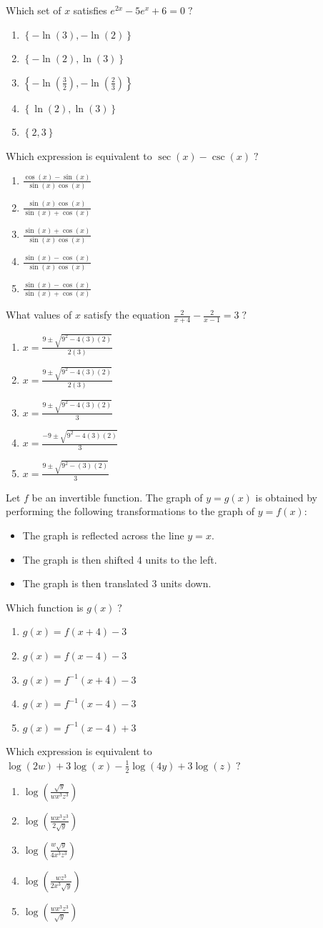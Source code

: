 \documentclass[letterstyle,12pt]{extarticle}
\newcounter{qcounter}
\newcommand{\choices}[5]{
\vspace{0.8em} 
\begin{enumerate}[label=(\Alph*)]
\setlength\itemsep{1em} 
\item
#1 
\item 
#2
\item
#3
\item
#4
\item
#5
\end{enumerate}
}
\newcommand{\ans}[1]{{\color{black} #1}}
\newenvironment{question}
    {\begin{minipage}{0.9 \textwidth}
        \item
    }
    { 
    \end{minipage} \vspace{4ex}
    }
\begin{document}
\begin{list}{\textbf{.}~}{}
\begin{question}
Which set of \(x\) satisfies \(e^{2x} - 5e^x + 6 = 0 \; ?\)
\choices
{\(\left\{-\ln(3), -\ln(2)\right\}\)}
{\(\left\{ -\ln(2), \ln(3)\right\}\)}
{\(\left\{-\ln \left(\frac{3}{2}\right), -\ln \left(\frac{2}{3}\right)\right\}\)}
{\ans{{\(\left\{ \ln(2), \ln(3)\right\}\)}}}
{\(\left\{2, 3\right\}\)}
\end{question}

\begin{question}
Which expression is equivalent to \(\sec(x) - \csc(x) \; ?\)
\choices
{\(\frac{\cos(x) - \sin(x)}{\sin(x) \cos(x)}\)}
{\(\frac{\sin(x) \cos(x)}{\sin(x) + \cos(x)}\)}
{\(\frac{\sin(x) + \cos(x)}{\sin(x) \cos(x)}\)}
{\ans{\(\frac{\sin(x) - \cos(x)}{\sin(x) \cos(x)}\)}}
{\(\frac{\sin(x) - \cos(x)}{\sin(x) + \cos(x)}\)}
\end{question}

\begin{question}
What values of \(x\) satisfy the equation \(\frac{2}{x + 4} - \frac{2}{x - 1} = 3 \; ?\)
\choices
{\(x = \frac{9 \pm \sqrt{9^2 - 4(3)(2)}}{2(3)}\)}
{\ans{\(x = \frac{9 \pm \sqrt{9^2 - 4(3)(2)}}{2(3)}\)}}
{\(x = \frac{9 \pm \sqrt{9^2 - 4(3)(2)}}{3}\)}
{\(x = \frac{-9 \pm \sqrt{9^2 - 4(3)(2)}}{3}\)}
{\(x = \frac{9 \pm \sqrt{9^2 - (3)(2)}}{3}\)}
\end{question}

\begin{question}
Let \(f\) be an invertible function. The graph of \(y = g(x)\) is obtained by performing the following transformations to the graph of \(y = f(x)\):
\begin{itemize}
    \item 
    The graph is reflected across the line \(y = x.\)
    \item
    The graph is then shifted 4 units to the left.
    \item
    The graph is then translated 3 units down.
\end{itemize}
Which function is \(g(x) \; ?\)
\choices
{\(g(x) = f(x + 4) - 3\)}
{\(g(x) = f(x - 4) - 3\)}
{\ans{\(g(x) = f^{-1}(x + 4) - 3\)}}
{\(g(x) = f^{-1}(x - 4) - 3\)}
{\(g(x) = f^{-1}(x - 4) + 3\)}
\end{question}

\begin{question}
Which expression is equivalent to \(\log(2w) + 3 \log(x) - \frac{1}{2} \log(4y) + 3 \log(z) \; ?\)
\choices
{\(\log \left(\frac{\sqrt y}{wx^3 z^3}\right)\)}
{\(\log \left(\frac{wx^3 z^3}{2 \sqrt y}\right)\)}
{\(\log \left(\frac{w \sqrt y}{4x^3 z^3}\right)\)}
{\(\log \left(\frac{wz^3}{2x^3 \sqrt y}\right)\)}
{\ans{\(\log \left(\frac{wx^3 z^3}{\sqrt y}\right)\)}}
\end{question}

\end{list}
\end{document}
